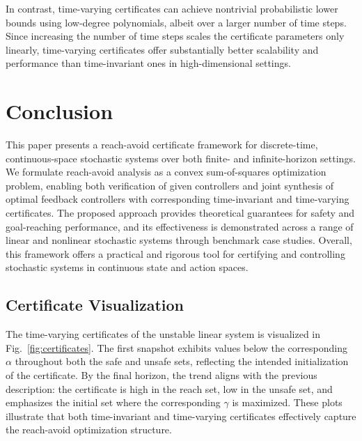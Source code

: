 \documentclass[journal,twoside,web]{ieeecolor}
\theoremstyle{definition}
\theoremstyle{plain}
\theoremstyle{plain}
\begin{document}
In contrast, time-varying certificates can achieve nontrivial probabilistic lower bounds using low-degree polynomials, albeit over a larger number of time steps. Since increasing the number of time steps scales the certificate parameters only linearly, time-varying certificates offer substantially better scalability and performance than time-invariant ones in high-dimensional settings.






\section{Conclusion}

This paper presents a reach-avoid certificate framework for discrete-time, continuous-space stochastic systems over both finite- and infinite-horizon settings. We formulate reach-avoid analysis as a convex sum-of-squares optimization problem, enabling both verification of given controllers and joint synthesis of optimal feedback controllers with corresponding time-invariant and time-varying certificates. The proposed approach provides theoretical guarantees for safety and goal-reaching performance, and its effectiveness is demonstrated across a range of linear and nonlinear stochastic systems through benchmark case studies. Overall, this framework offers a practical and rigorous tool for certifying and controlling stochastic systems in continuous state and action spaces.


\appendix
\subsection{Certificate Visualization}
\label{app:cert}



The time-varying certificates of the unstable linear system is visualized in Fig.~\ref{fig:certificates}. The first snapshot exhibits values below the corresponding $\alpha$ throughout both the safe and unsafe sets, reflecting the intended initialization of the certificate. By the final horizon, the trend aligns with the previous description: the certificate is high in the reach set, low in the unsafe set, and emphasizes the initial set where the corresponding $\gamma$ is maximized. These plots illustrate that both time-invariant and time-varying certificates effectively capture the reach-avoid optimization structure.
\end{document}
